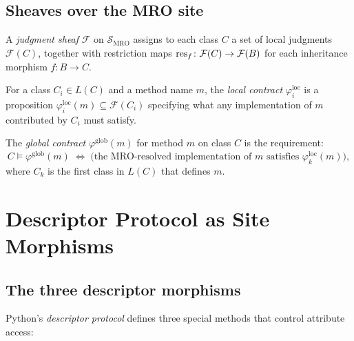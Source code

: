 \documentclass[11pt]{article}
\newcommand{\Clin}[1]{L(#1)}                     %
\newcommand{\MROSite}{\mathcal{S}_{\mathrm{MRO}}} %
\newcommand{\LocalContr}[1]{\varphi_{#1}^{\mathrm{loc}}}
\newcommand{\GlobalContr}[1]{\varphi_{#1}^{\mathrm{glob}}}
\newcommand{\ContractSat}{\models}
\begin{document}
\subsection{Sheaves over the MRO site}

A \emph{judgment sheaf} $\mathcal{F}$ on $\MROSite$ assigns to each
class $C$ a set of local judgments $\mathcal{F}(C)$, together with
restriction maps $\mathrm{res}_{f}\colon\mathcal{F}(C) \to \mathcal{F}(B)$
for each inheritance morphism $f\colon B \to C$.

\begin{definition}\label{def:local-contract}
  For a class $C_i \in \Clin{C}$ and a method name $m$, the
  \emph{local contract} $\LocalContr{i}$ is a proposition
  $\LocalContr{i}(m) \subseteq \mathcal{F}(C_i)$ specifying what any
  implementation of $m$ contributed by $C_i$ must satisfy.
\end{definition}

\begin{definition}\label{def:global-contract}
  The \emph{global contract} $\GlobalContr{}(m)$ for method $m$ on
  class $C$ is the requirement:
  \[
    C \ContractSat \GlobalContr{}(m) \;\iff\;
    \bigl(\text{the MRO-resolved implementation of } m \text{ satisfies }
    \LocalContr{k}(m)\bigr),
  \]
  where $C_k$ is the first class in $\Clin{C}$ that defines $m$.
\end{definition}

\section{Descriptor Protocol as Site Morphisms}\label{sec:desc}

\subsection{The three descriptor morphisms}

Python's \emph{descriptor protocol} defines three special methods that
control attribute access:
\end{document}

